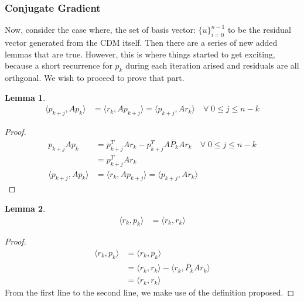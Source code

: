 \documentclass[]{article}
\theoremstyle{definition}
\newtheorem{lemma}{Lemma}[subsection]    %
\begin{document}
        \subsubsection{Conjugate Gradient}
            Now, consider the case where, the set of basis vector: $\{u\}_{i = 0}^{n - 1}$ to be the residual vector generated from the CDM itself. Then there are a series of new added lemmas that are true. However, this is where things started to get exciting, because a short recurrence for $p_k$ during each iteration arised and residuals are all orthgonal. We wish to proceed to prove that part. 
            \begin{lemma}\label{lemma:CG_Lemma_1}
                \begin{align}
                    \langle p_{k + j}, Ap_k\rangle
                    &=\langle r_k, Ap_{k + j}\rangle
                    = \langle p_{k + j}, Ar_k\rangle \quad \forall\; 0 \le j \le n - k
                \end{align}
            \end{lemma}
            \begin{proof}
                \begin{align}
                    p_{k + j} Ap_k &= p_{k + j}^TAr_k - p_{k + j}^TA\overline{P}_{k}Ar_k \quad 
                    \forall\; 0 \le j \le n - k
                    \\
                    &= p_{k + j}^TAr_k
                    \\
                    \langle p_{k + j}, Ap_k\rangle
                    &= \langle r_k, Ap_{k + j}\rangle
                    = \langle p_{k + j}, Ar_k\rangle
                \end{align}
            \end{proof}
            \begin{lemma}\label{lemma:CG_Lemma_2}
                \begin{align}
                    \langle r_k, p_k\rangle &= \langle r_k, r_k\rangle
                \end{align}
            \end{lemma}
            \begin{proof}
                \begin{align}
                    \langle r_k, p_k\rangle &= 
                    \langle r_k, p_k\rangle
                    \\
                    &= \langle r_k, r_k\rangle - \langle r_k, \overline{P}_kAr_k\rangle
                    \\
                    &= \langle r_k, r_k\rangle
                \end{align}
                From the first line to the second line, we make use of the definition proposed. 
            \end{proof}
\end{document}

